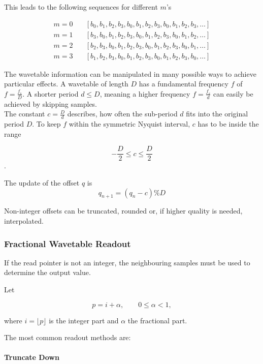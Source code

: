 This leads to the following sequences for different $m$'s

\begin{align*}
	m=0 \quad &[b_0,b_1,b_2,b_3,b_0,b_1,b_2,b_3,b_0,b_1,b_2,b_3,\ldots] \\
	m=1 \quad &[b_3,b_0,b_1,b_2,b_3,b_0,b_1,b_2,b_3,b_0,b_1,b_2,\ldots] \\
	m=2 \quad &[b_2,b_3,b_0,b_1,b_2,b_3,b_0,b_1,b_2,b_3,b_0,b_1,\ldots] \\
	m=3 \quad &[b_1,b_2,b_3,b_0,b_1,b_2,b_3,b_0,b_1,b_2,b_3,b_0,\ldots]
\end{align*}

The wavetable information can be manipulated in many possible ways to achieve
particular effects. A wavetable of length $D$ has a fundamental frequency $f$
of $f = \frac{f_s}{D}$. A shorter period $d \leq D$, meaning a higher frequency
$f = \frac{f_s}{d}$ can easily be achieved by skipping samples. \\

The constant $c = \frac{D}{d}$ describes, how often the sub-period $d$ fits into the original period $D$. To keep $f$ within the symmetric Nyquist interval, $c$ has to be inside the range

\begin{equation*}
	-\frac{D}{2} \leq c \leq \frac{D}{2}
\end{equation*}.

The update of the offset $q$ is
\begin{equation*}
	q_{n+1} = \left( q_n - c \right) \% D
\end{equation*}

Non-integer offsets can be truncated, rounded or, if higher quality is needed, interpolated.

\subsubsection{Fractional Wavetable Readout}

If the read pointer is not an integer, the neighbouring samples must be
used to determine the output value.

Let

\[
p=i+\alpha,
\qquad
0\le\alpha<1,
\]

where $i=\lfloor p\rfloor$ is the integer part and $\alpha$ the
fractional part.

The most common readout methods are:

\paragraph{Truncate Down}

